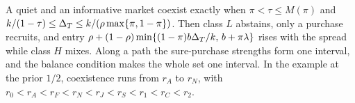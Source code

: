 \begin{chaptersummary}
A quiet and an informative market coexist exactly when \(\pi<\tau\le M(\pi)\) and
\(k/(1-\tau)\le\Delta_T\le k/(\rho\max\{\pi,1-\pi\})\). Then class \(L\) abstains, only a purchase recruits, and entry
\(\rho+(1-\rho)\min\{(1-\pi)b\Delta_T/k,\,b+\pi\lambda\}\) rises with the spread while class \(H\) mixes. Along a path the
sure-purchase strengths form one interval, and the balance condition makes the whole set one interval. In the example
at the prior \(1/2\), coexistence runs from \(r_A\) to \(r_N\), with \(r_0<r_A<r_F<r_N<r_J<r_S<r_1<r_C<r_2\).
\end{chaptersummary}
